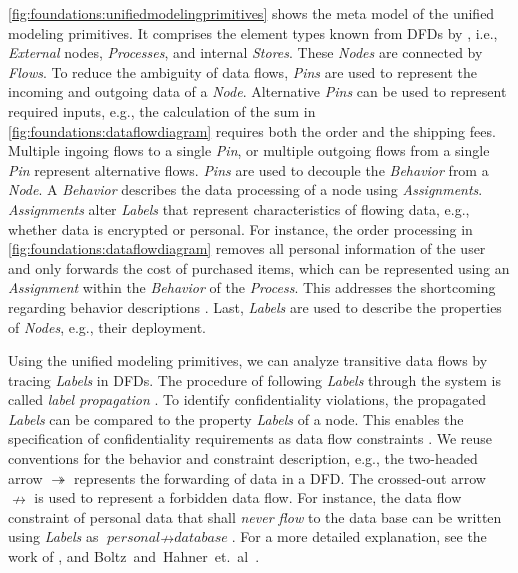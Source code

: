 \autoref{fig:foundations:unifiedmodelingprimitives} shows the meta model of the unified modeling primitives.
It comprises the element types known from \acp{DFD} by \textcite{demarco_structure_1979}, i.e., \emph{External} nodes, \emph{Processes}, and internal \emph{Stores}.
These \emph{Nodes} are connected by \emph{Flows}.
To reduce the ambiguity of data flows, \emph{Pins} are used to represent the incoming and outgoing data of a \emph{Node}.
Alternative \emph{Pins} can be used to represent required inputs, e.g., the calculation of the sum in \autoref{fig:foundations:dataflowdiagram} requires both the order and the shipping fees.
Multiple ingoing flows to a single \emph{Pin}, or multiple outgoing flows from a single \emph{Pin} represent alternative flows.
\emph{Pins} are used to decouple the \emph{Behavior} from a \emph{Node}.
A \emph{Behavior} describes the data processing of a node using \emph{Assignments}.
\emph{Assignments} alter \emph{Labels} that represent characteristics of flowing data, e.g., whether data is encrypted or personal.
For instance, the order processing in \autoref{fig:foundations:dataflowdiagram} removes all personal information of the user and only forwards the cost of purchased items, which can be represented using an \emph{Assignment} within the \emph{Behavior} of the \emph{Process}.
This addresses the shortcoming regarding behavior descriptions \cite{sion_security_2020}.
Last, \emph{Labels} are used to describe the properties of \emph{Nodes}, e.g., their deployment.

Using the unified modeling primitives, we can analyze transitive data flows by tracing \emph{Labels} in \acp{DFD}.
The procedure of following \emph{Labels} through the system is called \emph{label propagation} \cite{seifermann_architectural_2022,seifermann_unified_2021,seifermann_detecting_2022}.
To identify confidentiality violations, the propagated \emph{Labels} can be compared to the property \emph{Labels} of a node.
This enables the specification of confidentiality requirements as data flow constraints \cite{hahner_modeling_2021,hahner_domain-specific_2020}.
We reuse conventions for the behavior and constraint description, e.g., the two-headed arrow $\twoheadrightarrow$ represents the forwarding of data in a \ac{DFD}.
The crossed-out arrow $\nrightarrow$ is used to represent a forbidden data flow.
For instance, the data flow constraint of personal data that shall \emph{never flow} to the data base can be written using \emph{Labels} as $\textit{personal} \nrightarrow \textit{database}$.
For a more detailed explanation, see the work of \textcite{seifermann_architectural_2022}, and Boltz~and~Hahner~et.~al~\cite{boltz_extensible_2024}.


